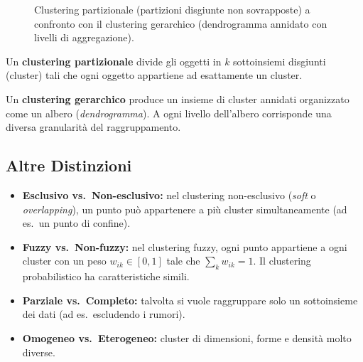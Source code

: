 \begin{figure}[htbp]
{%
}
\caption{Clustering partizionale (partizioni disgiunte non sovrapposte) a confronto con il clustering gerarchico (dendrogramma annidato con livelli di aggregazione).}
\label{fig:partitional-vs-hierarchical}
\end{figure}

\begin{definition}
Un \textbf{clustering partizionale} divide gli oggetti in $k$ sottoinsiemi disgiunti (cluster) tali che ogni oggetto appartiene ad esattamente un cluster.
\end{definition}

\begin{definition}
Un \textbf{clustering gerarchico} produce un insieme di cluster annidati organizzato come un albero (\textit{dendrogramma}). A ogni livello dell'albero corrisponde una diversa granularità del raggruppamento.
\end{definition}

\subsection{Altre Distinzioni}

\begin{itemize}
  \item \textbf{Esclusivo vs.\ Non-esclusivo:} nel clustering non-esclusivo (\textit{soft} o \textit{overlapping}), un punto può appartenere a più cluster simultaneamente (ad es.\ un punto di confine).
  \item \textbf{Fuzzy vs.\ Non-fuzzy:} nel clustering fuzzy, ogni punto appartiene a ogni cluster con un peso $w_{ik} \in [0,1]$ tale che $\sum_k w_{ik} = 1$. Il clustering probabilistico ha caratteristiche simili.
  \item \textbf{Parziale vs.\ Completo:} talvolta si vuole raggruppare solo un sottoinsieme dei dati (ad es.\ escludendo i rumori).
  \item \textbf{Omogeneo vs.\ Eterogeneo:} cluster di dimensioni, forme e densità molto diverse.
\end{itemize}

